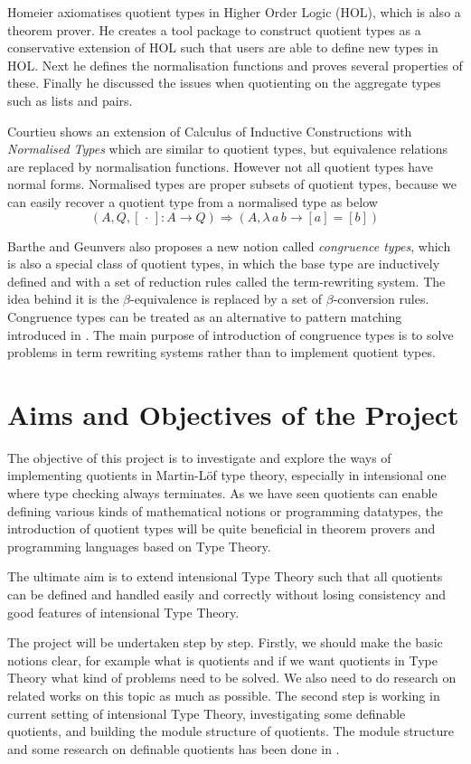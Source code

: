 \documentclass{article}
\theoremstyle{definition}
\newcommand{\dotph}{\,\cdot\,}
\providecommand{\class}[1]{[#1]}
\newcommand{\itt}{intensional Type Theory}
\newcommand{\mltt}{Martin-L\"{o}f type theory}
\begin{document}
Homeier \cite{hom} axiomatises quotient types in Higher Order Logic
(HOL), which is also a theorem prover. He creates a tool package to
construct quotient types as a conservative extension of HOL such that
users are able to define new types in HOL. Next he defines the
normalisation functions and proves several properties of
these. Finally he discussed the issues when quotienting on the
aggregate types such as lists and pairs.


Courtieu \cite{cou:01} shows an extension of Calculus of Inductive Constructions
with \emph{Normalised Types} which are similar to quotient types, but equivalence relations are replaced by normalisation functions. 
However not all quotient types have normal forms. Normalised types are
proper subsets of quotient types, because we can easily recover a quotient
type from a normalised type as below
\[ (A, Q, \class\dotph \colon A \to Q) \Rightarrow(A, \lambda \,a \,b\to \class a = \class b)\]


Barthe and Geunvers \cite{bar:96} also proposes a new notion called
\emph{congruence types}, which is also a special class of quotient
types, in which the base type are inductively defined and with a set
of reduction rules called the term-rewriting system. The idea behind
it is the $\beta$-equivalence is replaced by a set of
$\beta$-conversion rules. Congruence types can be treated as an
alternative to pattern matching introduced in \cite{coq:92}. The main
purpose of introduction of congruence types is to solve problems in
term rewriting systems rather than to implement quotient types.


\section{Aims and Objectives of the Project}

The objective of this project is to investigate and explore the ways of
implementing quotients in \mltt{}, especially in intensional
one where type checking always terminates.
As we have seen quotients can enable defining various kinds of
mathematical notions or programming datatypes, the introduction of
quotient types will be quite beneficial in theorem provers and
programming languages based on Type Theory. 

The ultimate aim is to extend \itt{} such that all quotients can be
defined and handled easily and correctly without losing consistency
and good features of \itt{}.

The project will be undertaken step by step. Firstly, we should make
the basic notions clear, for example what is quotients and if we want
quotients in Type Theory what kind of problems need to be solved. We
also need to do research on related works on this topic as much as possible.
The second step is working in current setting of \itt{},
investigating some definable quotients, and building the module structure of quotients. The module structure
and some research on definable quotients has been done in
\cite{aan}.
\end{document}

